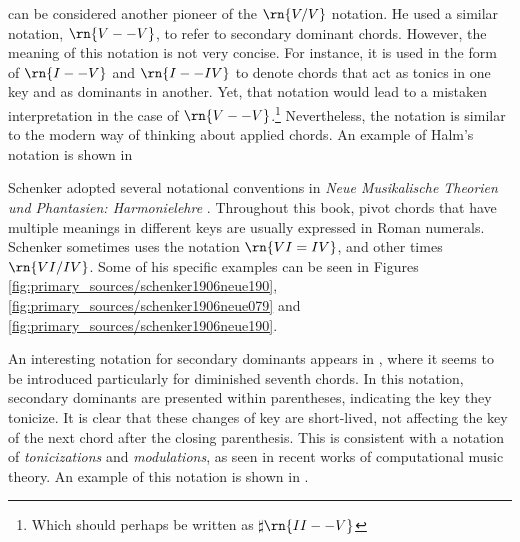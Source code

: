\textcite{halm1900harmonielehre} can be considered another
pioneer of the $\rn{V/V}$ notation. He used a similar
notation, $\rn{V--V}$, to refer to secondary dominant
chords. However, the meaning of this notation is not very
concise. For instance, it is used in the form of $\rn{I--V}$
and $\rn{I--IV}$ to denote chords that act as tonics in one
key and as dominants in another. Yet, that notation would
lead to a mistaken interpretation in the case of
$\rn{V--V}$.\footnote{Which should perhaps be written as
$\sharp{}\rn{II--V}$} Nevertheless, the notation is similar
to the modern way of thinking about applied chords. An
example of Halm's notation is shown in


Schenker adopted several notational conventions in
\emph{Neue Musikalische Theorien und Phantasien:
Harmonielehre} \parencite{schenker1906neue}. Throughout this
book, pivot chords that have multiple meanings in different
keys are usually expressed in Roman numerals. Schenker
sometimes uses the notation $\rn{VI=IV}$, and other times
$\rn{VI/IV}$. Some of his specific examples can be seen in
Figures \ref{fig:primary_sources/schenker1906neue190},
\ref{fig:primary_sources/schenker1906neue079} and
\ref{fig:primary_sources/schenker1906neue190}.




An interesting notation for secondary dominants appears in
\textcite{white1911harmonic}, where it seems to be
introduced particularly for diminished seventh chords. In
this notation, secondary dominants are presented within
parentheses, indicating the key they tonicize. It is clear
that these changes of key are short-lived, not affecting the
key of the next chord after the closing parenthesis. This is
consistent with a notation of \emph{tonicizations} and
\emph{modulations}, as seen in recent works of computational
music theory. An example of this notation is shown in
.


